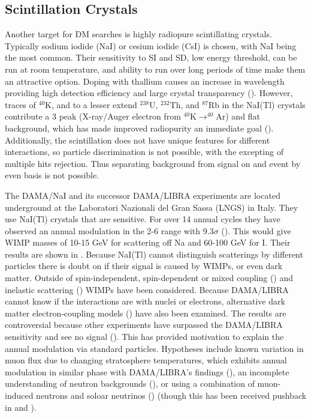 \subsection{Scintillation Crystals}
\label{subsec:crystals}
Another target for DM searches is highly radiopure scintillating crystals.  Typically sodium iodide (NaI) or cesium iodide (CsI) is chosen,
with NaI being the most common.  Their sensitivity to SI and SD, low energy threshold, can be run at room temperature,
and ability to run over long periods of time
make them an attractive option.  Doping with thallium causes an increase in wavelength providing high detection efficiency and large
crystal transparency ().  However, traces of $^{40}$K, and to a lesser extend $^{238}$U, $^{232}$Th,
and $^{87}$Rb in the NaI(Tl) crystals contribute a 3 \kevee peak (X-ray/Auger electron from $^{40}\mathrm{K} \rightarrow ^{40}\mathrm{Ar}$)
and flat background, which has made improved radiopurity an immediate goal ().  Additionally, the scintillation
does not have unique features for different interactions, so particle discrimination is not possible, with the excepting of
multiple hits rejection.  Thus separating background from signal on and event by even basis is not possible.

The DAMA/NaI and its successor DAMA/LIBRA experiments are located underground at the Laboratori Nazionali del Gran Sassa (LNGS) in
Italy.  They use NaI(Tl) crystals that are sensitive.  For over 14 annual cycles they have observed an annual modulation in the 2-6 \kevee
range with 9.3$\sigma$ ().  This would give WIMP masses of 10-15 GeV for scattering off Na
and 60-100 GeV for I.  Their results are shown in .  Because NaI(Tl) cannot distinguish scatterings by different particles there is doubt on if their signal
is caused by WIMPs, or even dark matter.  Outside of spin-independent, spin-dependent or mixed coupling ()
and inelastic scattering () WIMPs 
have been considered.  Because DAMA/LIBRA cannot know if the interactions are with nuclei or electrons, alternative dark matter
electron-coupling models () have also been examined.  The results are controversial because other experiments
have surpassed the DAMA/LIBRA sensitivity and see no signal ().  This has provided motivation to explain the annual modulation via
standard particles.  Hypotheses include known variation in muon flux due to changing stratosphere temperatures, which exhibits
annual modulation in similar phase with DAMA/LIBRA's findings (), an incomplete understanding of neutron backgrounds
(), or using a combination of muon-induced neutrons and soloar neutrinos () (though this
has been received pushback in  and ).

